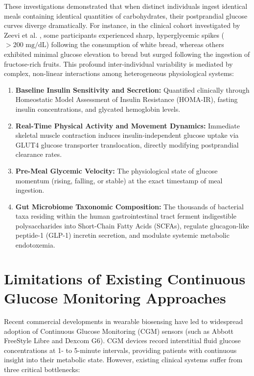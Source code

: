 These investigations demonstrated that when distinct individuals ingest identical meals containing identical quantities of carbohydrates, their postprandial glucose curves diverge dramatically. For instance, in the clinical cohort investigated by Zeevi et al. \cite{zeevi2015personalized}, some participants experienced sharp, hyperglycemic spikes ($>200\text{ mg/dL}$) following the consumption of white bread, whereas others exhibited minimal glucose elevation to bread but surged following the ingestion of fructose-rich fruits. This profound inter-individual variability is mediated by complex, non-linear interactions among heterogeneous physiological systems:
\begin{enumerate}
    \item \textbf{Baseline Insulin Sensitivity and Secretion:} Quantified clinically through Homeostatic Model Assessment of Insulin Resistance (HOMA-IR), fasting insulin concentrations, and glycated hemoglobin levels.
    \item \textbf{Real-Time Physical Activity and Movement Dynamics:} Immediate skeletal muscle contraction induces insulin-independent glucose uptake via GLUT4 glucose transporter translocation, directly modifying postprandial clearance rates.
    \item \textbf{Pre-Meal Glycemic Velocity:} The physiological state of glucose momentum (rising, falling, or stable) at the exact timestamp of meal ingestion.
    \item \textbf{Gut Microbiome Taxonomic Composition:} The thousands of bacterial taxa residing within the human gastrointestinal tract ferment indigestible polysaccharides into Short-Chain Fatty Acids (SCFAs), regulate glucagon-like peptide-1 (GLP-1) incretin secretion, and modulate systemic metabolic endotoxemia.
\end{enumerate}

\section{Limitations of Existing Continuous Glucose Monitoring Approaches}
Recent commercial developments in wearable biosensing have led to widespread adoption of Continuous Glucose Monitoring (CGM) sensors (such as Abbott FreeStyle Libre and Dexcom G6). CGM devices record interstitial fluid glucose concentrations at 1- to 5-minute intervals, providing patients with continuous insight into their metabolic state. However, existing clinical systems suffer from three critical bottlenecks:

